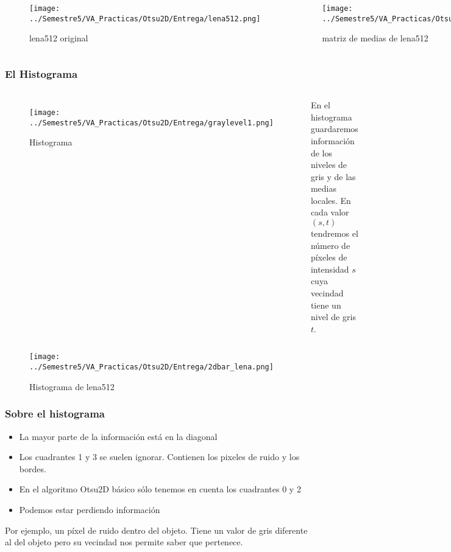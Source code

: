 \documentclass{beamer}
\begin{document}
\begin{frame}
\begin{columns}[t] %
\begin{figure}
\texttt{[image: ../Semestre5/VA\_Practicas/Otsu2D/Entrega/lena512.png]}
\caption{lena512 original}
\end{figure}

\begin{figure}
\texttt{[image: ../Semestre5/VA\_Practicas/Otsu2D/Entrega/lena512s.png]}
\caption{matriz de medias de lena512}
\end{figure}

\end{columns}
\end{frame}

\begin{frame}
\frametitle{El Histograma}
\begin{columns}[c] %
\begin{figure}
\texttt{[image: ../Semestre5/VA\_Practicas/Otsu2D/Entrega/graylevel1.png]}
\caption{Histograma \cite{p1}}
\end{figure}

En el histograma guardaremos información de los niveles de gris y de las medias locales. En cada valor $(s,t)$ tendremos el número de píxeles de intensidad $s$ cuya vecindad tiene un nivel de gris $t$. 

\end{columns}
\end{frame}

\begin{frame}
\begin{figure}
\texttt{[image: ../Semestre5/VA\_Practicas/Otsu2D/Entrega/2dbar\_lena.png]}
\caption{Histograma de lena512}
\end{figure}
\end{frame}

\begin{frame}
\frametitle{Sobre el histograma}
\begin{itemize}
\item La mayor parte de la información está en la diagonal
\item Los cuadrantes 1 y 3 se suelen ignorar. Contienen los pixeles de ruido y los bordes.
\item En el algoritmo Otsu2D básico sólo tenemos en cuenta los cuadrantes 0 y 2
\item Podemos estar perdiendo información
\end{itemize}
Por ejemplo, un píxel de ruido dentro del objeto. Tiene un valor de gris diferente al del objeto pero su vecindad nos permite saber que pertenece.
\end{frame}
\end{document}
